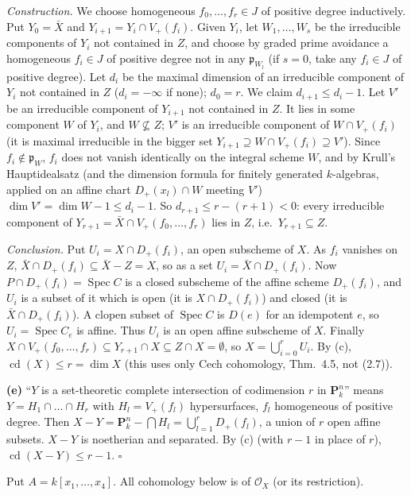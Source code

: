 \documentclass[11pt]{article}
\begin{document}
\emph{Construction.} We choose homogeneous $f_0,\dots,f_r\in J$ of positive degree inductively. Put $Y_0=\bar X$ and $Y_{i+1}=Y_i\cap V_+(f_i)$. Given $Y_i$, let $W_1,\dots,W_s$ be the irreducible components of $Y_i$ not contained in $Z$, and choose by graded prime avoidance a homogeneous $f_i\in J$ of positive degree not in any $\mathfrak p_{W_l}$ (if $s=0$, take any $f_i\in J$ of positive degree). Let $d_i$ be the maximal dimension of an irreducible component of $Y_i$ not contained in $Z$ ($d_i=-\infty$ if none); $d_0=r$. We claim $d_{i+1}\le d_i-1$. Let $V'$ be an irreducible component of $Y_{i+1}$ not contained in $Z$. It lies in some component $W$ of $Y_i$, and $W\not\subseteq Z$; $V'$ is an irreducible component of $W\cap V_+(f_i)$ (it is maximal irreducible in the bigger set $Y_{i+1}\supseteq W\cap V_+(f_i)\supseteq V'$). Since $f_i\notin\mathfrak p_W$, $f_i$ does not vanish identically on the integral scheme $W$, and by Krull's Hauptidealsatz (and the dimension formula for finitely generated $k$-algebras, applied on an affine chart $D_+(x_l)\cap W$ meeting $V'$) $\dim V'=\dim W-1\le d_i-1$. So $d_{r+1}\le r-(r+1)<0$: every irreducible component of $Y_{r+1}=\bar X\cap V_+(f_0,\dots,f_r)$ lies in $Z$, i.e.\ $Y_{r+1}\subseteq Z$.

\emph{Conclusion.} Put $U_i=X\cap D_+(f_i)$, an open subscheme of $X$. As $f_i$ vanishes on $Z$, $\bar X\cap D_+(f_i)\subseteq\bar X-Z=X$, so as a set $U_i=\bar X\cap D_+(f_i)$. Now $P\cap D_+(f_i)=\operatorname{Spec}C$ is a closed subscheme of the affine scheme $D_+(f_i)$, and $U_i$ is a subset of it which is open (it is $X\cap D_+(f_i)$) and closed (it is $\bar X\cap D_+(f_i)$). A clopen subset of $\operatorname{Spec}C$ is $D(e)$ for an idempotent $e$, so $U_i=\operatorname{Spec}C_e$ is affine. Thus $U_i$ is an open affine subscheme of $X$. Finally $X\cap V_+(f_0,\dots,f_r)\subseteq Y_{r+1}\cap X\subseteq Z\cap X=\emptyset$, so $X=\bigcup_{i=0}^rU_i$. By (c), $\operatorname{cd}(X)\le r=\dim X$ (this uses only Cech cohomology, Thm.~4.5, not (2.7)).

\textbf{(e)} ``$Y$ is a set-theoretic complete intersection of codimension $r$ in $\mathbf P^n_k$'' means $Y=H_1\cap\dots\cap H_r$ with $H_l=V_+(f_l)$ hypersurfaces, $f_l$ homogeneous of positive degree. Then $X-Y=\mathbf P^n_k-\bigcap H_l=\bigcup_{l=1}^rD_+(f_l)$, a union of $r$ open affine subsets. $X-Y$ is noetherian and separated. By (c) (with $r-1$ in place of $r$), $\operatorname{cd}(X-Y)\le r-1$. \hfill$\square$

\pf
Put $A=k[x_1,\dots,x_4]$. All cohomology below is of $\mathcal O_X$ (or its restriction).
\end{document}
